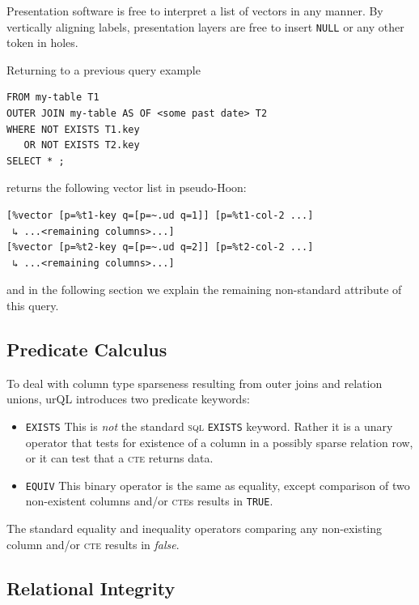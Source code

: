 \documentclass[twoside]{article}
\begin{document}
Presentation software is free to interpret a list of vectors in any manner. By vertically aligning labels, presentation layers are free to insert \lstinline[style=inlinecode]{NULL} or any other token in holes.

Returning to a previous query example

\begin{lstlisting}[style=listingcode_sql]
FROM my-table T1
OUTER JOIN my-table AS OF <some past date> T2
WHERE NOT EXISTS T1.key
   OR NOT EXISTS T2.key
SELECT * ;
\end{lstlisting}

\noindent
returns the following vector list in pseudo-Hoon:

\begin{lstlisting}[style=listingcode_sql]
[%vector [p=%t1-key q=[p=~.ud q=1]] [p=%t1-col-2 ...]
 ↳ ...<remaining columns>...]
[%vector [p=%t2-key q=[p=~.ud q=2]] [p=%t2-col-2 ...]
 ↳ ...<remaining columns>...]
\end{lstlisting}

\noindent
and in the following section we explain the remaining non-standard attribute of this query.

\subsection{Predicate Calculus}

To deal with column type sparseness resulting from outer joins and relation unions, urQL introduces two predicate keywords:

\begin{itemize}
\item  \lstinline[style=inlinecode]{EXISTS} This is \emph{not} the standard \textsc{sql} \lstinline[style=inlinecode]{EXISTS} keyword. Rather it is a unary operator that tests for existence of a column in a possibly sparse relation row, or it can test that a \textsc{cte} returns data.

\item  \lstinline[style=inlinecode]{EQUIV} This binary operator is the same as equality, except comparison of two non-existent columns and/or \textsc{cte}s results in \lstinline[style=inlinecode]{TRUE}.
\end{itemize}

\noindent
The standard equality and inequality operators comparing any non-existing column and/or \textsc{cte} results in \emph{false}.

\subsection{Relational Integrity}
\end{document}
